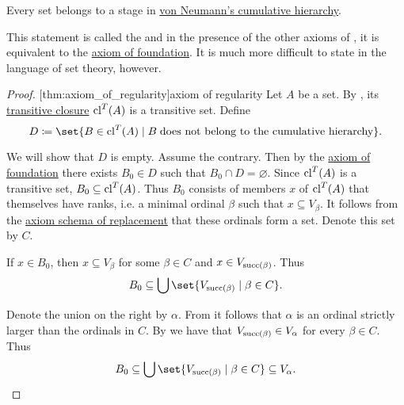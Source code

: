 \begin{theorem}\label{thm:axiom_of_regularity}
  Every set belongs to a stage in \hyperref[def:cumulative_hierarchy]{von Neumann's cumulative hierarchy}.

  This statement is called the  and in the presence of the other axioms of , it is equivalent to the \hyperref[def:zfc/foundation]{axiom of foundation}. It is much more difficult to state in the language of set theory, however.
\end{theorem}
\begin{proof}
  [thm:axiom_of_regularity]{axiom of regularity} Let \( A \) be a set. By , its \hyperref[def:transitive_closure_of_a_set]{transitive closure} \( \operatorname{cl}^T(A) \) is a transitive set. Define
  \begin{equation*}
    D \coloneqq \set{ B \in \cl^T(A) \given B \T{does not belong to the cumulative hierarchy} }.
  \end{equation*}

  We will show that \( D \) is empty. Assume the contrary. Then by the \hyperref[def:zfc/foundation]{axiom of foundation} there exists \( B_0 \in D \) such that \( B_0 \cap D = \varnothing \). Since \( \operatorname{cl}^T(A) \) is a transitive set, \( B_0 \subseteq \operatorname{cl}^T(A) \). Thus \( B_0 \) consists of members \( x \) of \( \operatorname{cl}^T(A) \) that themselves have ranks, i.e. a minimal ordinal \( \beta \) such that \( x \subseteq V_\beta \). It follows from the \hyperref[def:zfc/replacement]{axiom schema of replacement} that these ordinals form a set. Denote this set by \( C \).

  If \( x \in B_0 \), then \( x \subseteq V_\beta \) for some \( \beta \in C \) and \( x \in V_{\operatorname{succ}(\beta)} \). Thus
  \begin{equation*}
    B_0 \subseteq \bigcup\set{ V_{\op{succ}(\beta)} \given \beta \in C }.
  \end{equation*}

  Denote the union on the right by \( \alpha \). From  it follows that \( \alpha \) is an ordinal strictly larger than the ordinals in \( C \). By  we have that \( V_{\operatorname{succ}(\beta)} \in V_\alpha \) for every \( \beta \in C \). Thus
  \begin{equation*}
    B_0 \subseteq \bigcup\set{ V_{\op{succ}(\beta)} \given \beta \in C } \subseteq V_\alpha.
  \end{equation*}


\end{proof}
